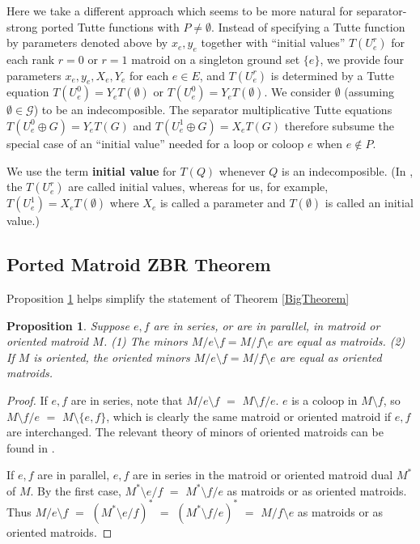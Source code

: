 \documentclass[12pt,leqno]{amsart}
\newtheorem{prop}[lem]{Proposition}
\theoremstyle{remark}
\begin{document}
Here we take a different approach which seems to be more natural for
separator-strong ported Tutte functions with $P\neq \emptyset$.  
Instead of specifying a Tutte function by parameters denoted above by
$x_e, y_e$ together with ``initial values'' $T(U^r_e)$ for each rank $r=0$ or
$r=1$ matroid on a singleton ground set $\{e\}$, we provide
four parameters $x_e,y_e, X_e, Y_e$ for each $e\in E$, and
$T(U^r_e)$ is determined by a Tutte equation $T(U^0_e)=Y_eT(\emptyset)$
or $T(U^0_e)=Y_eT(\emptyset)$.  We consider $\emptyset$ (assuming
$\emptyset\in\mathcal{G}$) to be an indecomposible.  The
separator multiplicative Tutte equations 
$T(U^0_e\oplus G)=Y_eT(G)$
and 
$T(U^1_e\oplus G)=X_eT(G)$ therefore subsume the special case
of an ``initial value'' needed for a loop or coloop $e$ when $e\not\in P$.

We use the term \textbf{initial value} for $T(Q)$ whenever $Q$ is 
an indecomposible.  (In \cite{MR93a:05047}, the $T(U^r_e)$ are called initial
values, whereas for us, for example, $T(U^1_e)=X_eT(\emptyset)$ where
$X_e$ is called a parameter and $T(\emptyset)$ is called an initial value.) 

\subsection{Ported Matroid ZBR Theorem}


Proposition \ref{SameMinorProp} helps simplify the statement
of Theorem \ref{BigTheorem}


\begin{prop}
\label{SameMinorProp}
Suppose $e,f$ are in series, or are in parallel, in matroid or
oriented matroid $M$.
(1) The minors $M/e\setminus f=M/f\setminus e$
are equal as matroids.
(2) If $M$ is oriented, the oriented minors 
$M/e\setminus f=M/f\setminus e$ are equal as oriented matroids.
\end{prop}

\begin{proof}
If $e,f$ are in series, note that $M/e\setminus f$ $=$
$M\setminus f/e$.  $e$ is a coloop in $M\setminus f$,
so $M\setminus f/e$ $=$ $M\setminus\{e,f\}$, which is
clearly the same matroid or oriented matroid if $e,f$
are interchanged.  The relevant theory of minors of oriented matroids
can be found in \cite{OMBOOK}.

If $e,f$ are in parallel, $e,f$ are in series in 
the matroid or oriented matroid dual $M^*$ of $M$.
By the first case, $M^*\setminus e/ f$ $=$
$M^*\setminus f/e$ as matroids or as oriented matroids.
Thus $M/e\setminus f$ $=$ $(M^*\setminus e/ f)^*$ $=$
$(M^*\setminus f/ e)^*$ $=$ $M/f\setminus e$ as matroids or
as oriented matroids.
\end{proof}
\end{document}
